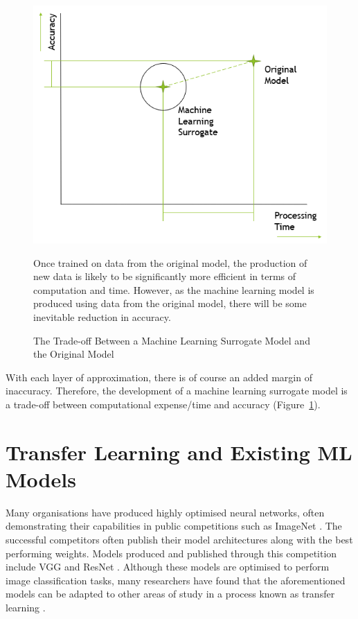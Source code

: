 \begin{figure}[h]
	\centering
	\includegraphics[scale=0.65]{Figures/MLS_vs_OM.png}
	\caption{The Trade-off Between a Machine Learning Surrogate Model and the Original Model} {Once trained on data from the original model, the production of new data is likely to be significantly more efficient in terms of computation and time. However, as the machine learning model is produced using data from the original model, there will be some inevitable reduction in accuracy.}
	\label{fig:surrogate_vs_model}
\end{figure}

\noindent With each layer of approximation, there is of course an added margin of inaccuracy. Therefore, the development of a machine learning surrogate model is a trade-off between computational expense/time and accuracy (Figure~\ref{fig:surrogate_vs_model}).

\section{Transfer Learning and Existing ML Models} \label{transfer}

Many organisations have produced highly optimised neural networks, often demonstrating their capabilities in public competitions such as ImageNet \cite{russakovsky2015imagenet}. The successful competitors often publish their model architectures along with the best performing weights. Models produced and published through this competition include VGG \cite{simonyan2014very} and ResNet \cite{he2015deep}. Although these models are optimised to perform image classification tasks, many researchers have found that the aforementioned models can be adapted to other areas of study in a process known as transfer learning \cite{tan2018survey}.

